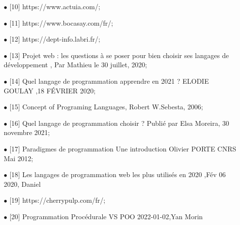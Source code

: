 \documentclass[a4paper,12pt]{article} %
\begin{document}
\begin{itemize}
    \item[$\bullet$] [10] https://www.actuia.com/;
    \item[$\bullet$] [11] https://www.bocasay.com/fr/;
    \item[$\bullet$] [12] https://dept-info.labri.fr/;
    \item[$\bullet$] [13] Projet web : les questions à se poser pour bien choisir ses langages de développement , Par Mathieu le 30 juillet, 2020; 
    \item[$\bullet$] [14] Quel langage de programmation apprendre en 2021 ? ELODIE GOULAY ,18 FÉVRIER 2020;
    \item[$\bullet$] [15] Concept of Programing Languages, Robert W.Sebesta, 2006;
     \item[$\bullet$] [16] Quel langage de programmation choisir ? Publié par Elsa Moreira, 30 novembre 2021;
     \item[$\bullet$] [17] Paradigmes de programmation Une introduction Olivier PORTE CNRS Mai 2012; 
     \item[$\bullet$] [18] Les langages de programmation web les plus utilisés en 2020 ,Fév 06 2020, Daniel  
     \item[$\bullet$] [19] https://cherrypulp.com/fr/;
     \item[$\bullet$] [20] Programmation Procédurale VS POO 2022-01-02,Yan Morin
\end{itemize}
\end{document}
